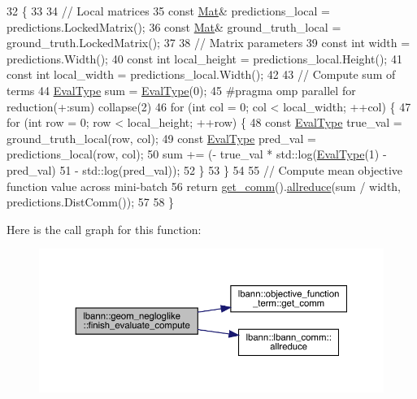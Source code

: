 \begin{DoxyCode}
32                                                                  \{
33 
34   \textcolor{comment}{// Local matrices}
35   \textcolor{keyword}{const} \hyperlink{base_8hpp_a68f11fdc31b62516cb310831bbe54d73}{Mat}& predictions\_local = predictions.LockedMatrix();
36   \textcolor{keyword}{const} \hyperlink{base_8hpp_a68f11fdc31b62516cb310831bbe54d73}{Mat}& ground\_truth\_local = ground\_truth.LockedMatrix();
37   
38   \textcolor{comment}{// Matrix parameters}
39   \textcolor{keyword}{const} \textcolor{keywordtype}{int} width = predictions.Width();
40   \textcolor{keyword}{const} \textcolor{keywordtype}{int} local\_height = predictions\_local.Height();
41   \textcolor{keyword}{const} \textcolor{keywordtype}{int} local\_width = predictions\_local.Width();
42 
43   \textcolor{comment}{// Compute sum of terms}
44   \hyperlink{base_8hpp_a3266f5ac18504bbadea983c109566867}{EvalType} sum = \hyperlink{base_8hpp_a3266f5ac18504bbadea983c109566867}{EvalType}(0);
45 \textcolor{preprocessor}{#pragma omp parallel for reduction(+:sum) collapse(2)}
46   \textcolor{keywordflow}{for} (\textcolor{keywordtype}{int} col = 0; col < local\_width; ++col) \{
47     \textcolor{keywordflow}{for} (\textcolor{keywordtype}{int} row = 0; row < local\_height; ++row) \{
48       \textcolor{keyword}{const} \hyperlink{base_8hpp_a3266f5ac18504bbadea983c109566867}{EvalType} true\_val = ground\_truth\_local(row, col);
49       \textcolor{keyword}{const} \hyperlink{base_8hpp_a3266f5ac18504bbadea983c109566867}{EvalType} pred\_val = predictions\_local(row, col);
50       sum += (- true\_val * std::log(\hyperlink{base_8hpp_a3266f5ac18504bbadea983c109566867}{EvalType}(1) - pred\_val)
51               - std::log(pred\_val));
52     \}
53   \}
54 
55   \textcolor{comment}{// Compute mean objective function value across mini-batch}
56   \textcolor{keywordflow}{return} \hyperlink{classlbann_1_1objective__function__term_a5f89b676a26a6b76ddc26563ac87beb9}{get\_comm}().\hyperlink{classlbann_1_1lbann__comm_af5631e5f0f54e4df4958eba9df2599ef}{allreduce}(sum / width, predictions.DistComm());
57 
58 \}
\end{DoxyCode}
Here is the call graph for this function\+:\nopagebreak
\begin{figure}[H]
\begin{center}
\leavevmode
\includegraphics[width=350pt]{classlbann_1_1geom__negloglike_a320ac2f029e0a43640878bc052bf5299_cgraph}
\end{center}
\end{figure}
